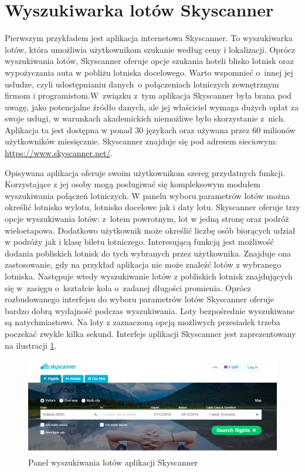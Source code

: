 \documentclass[12pt, twoside]{report}
\begin{document}
\section{Wyszukiwarka lotów Skyscanner}
Pierwszym przykładem jest aplikacja internetowa Skyscanner. To wyszukiwarka lotów, która umożliwia użytkownikom szukanie według ceny i lokalizacji. Oprócz wyszukiwania lotów, Skyscanner oferuje opcje szukania hoteli blisko lotnisk oraz wypożyczania auta w pobliżu lotniska docelowego. Warto wspomnieć o~innej jej usłudze, czyli udostępnianiu danych~o połączeniach lotniczych zewnętrznym firmom i programistom.W~związku z~tym aplikacja Skyscanner była brana pod uwagę, jako potencjalne źródło danych, ale jej właściciel wymaga dużych opłat za swoje usługi, w warunkach akademickich niemożliwe było skorzystanie z~nich.
Aplikacja ta jest dostępna w ponad 30 językach oraz używana przez 60 milionów użytkowników miesięcznie. Skyscanner znajduje się pod adresem sieciowym: 
\url{https://www.skyscanner.net/}.

Opisywana aplikacja oferuje swoim użytkownikom szereg przydatnych funkcji. Korzystające z jej osoby mogą posługiwać się kompleksowym modułem wyszukiwania połączeń lotniczych. W panelu wyboru parametrów lotów można określić lotnisko wylotu, lotnisko docelowe jak i daty lotu. Skyscanner oferuje trzy opcje wyszukiwania lotów: z~lotem powrotnym, lot w jedną stronę oraz podróż wieloetapowa. Dodatkowo użytkownik może określić liczbę osób biorących udział w podróży jak i klasę biletu lotniczego. Interesującą funkcją jest możliwość dodania pobliskich lotnisk do tych wybranych przez użytkownika. Znajduje ona zastosowanie, gdy na przykład aplikacja nie może znaleźć lotów z wybranego lotniska. Następuje wtedy wyszukiwanie lotów z pobliskich lotnisk znajdujących się w~zasięgu o~kształcie koła o~zadanej długości promienia.
Oprócz rozbudowanego interfejsu do wyboru parametrów lotów Skyscanner oferuje bardzo dobrą wydajność podczas wyszukiwania. Loty bezpośrednie wyszukiwane są natychmiastowo. Na loty z zaznaczoną opcją możliwych przesiadek trzeba poczekać zwykle kilka sekund. Interfejs aplikacji Skyscanner jest zaprezentowany na ilustracji \ref{fig:skyscanner_main}.

\begin{figure}[!ht]
\centering
\includegraphics[scale=0.50, keepaspectratio]{skyscanner_main.png}
\caption{Panel wyszukiwania lotów aplikacji Skyscanner}
\label{fig:skyscanner_main}
\end{figure}
\end{document}
